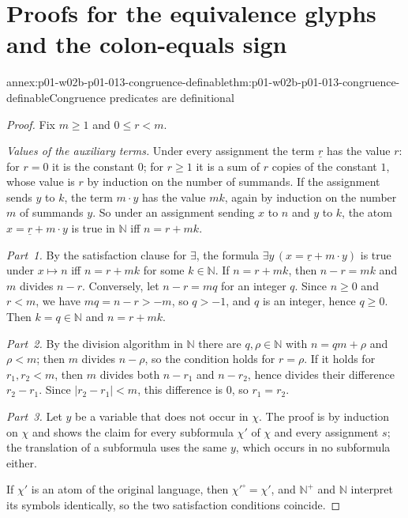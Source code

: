 \section{Proofs for the equivalence glyphs and the colon-equals sign}
\label{sec:annex-p01-w02b-p01-013-equivalence-audit}

\begin{annexitem}{annex:p01-w02b-p01-013-congruence-definable}{thm:p01-w02b-p01-013-congruence-definable}{Congruence predicates are definitional}
\begin{proof}
Fix \(m\geq1\) and \(0\leq r<m\).

\emph{Values of the auxiliary terms.}  Under every assignment the term
\(\underline r\) has the value \(r\): for \(r=0\) it is the constant \(0\);
for \(r\geq1\) it is a sum of \(r\) copies of the constant \(1\), whose value
is \(r\) by induction on the number of summands.  If the assignment sends
\(y\) to \(k\), the term \(m\cdot y\) has the value \(mk\), again by induction
on the number \(m\) of summands \(y\).  So under an assignment sending \(x\)
to \(n\) and \(y\) to \(k\), the atom \(x=\underline r+m\cdot y\) is true in
\(\mathbb N\) iff \(n=r+mk\).

\emph{Part~1.}  By the satisfaction clause for \(\exists\), the formula
\(\exists y\,(x=\underline r+m\cdot y)\) is true under \(x\mapsto n\) iff
\(n=r+mk\) for some \(k\in\mathbb N\).  If \(n=r+mk\), then \(n-r=mk\) and
\(m\) divides \(n-r\).  Conversely, let \(n-r=mq\) for an integer \(q\).
Since \(n\geq0\) and \(r<m\), we have \(mq=n-r>-m\), so \(q>-1\), and \(q\)
is an integer, hence \(q\geq0\).  Then \(k=q\in\mathbb N\) and \(n=r+mk\).

\emph{Part~2.}  By the division algorithm in \(\mathbb N\) there are
\(q,\rho\in\mathbb N\) with \(n=qm+\rho\) and \(\rho<m\); then \(m\) divides
\(n-\rho\), so the condition holds for \(r=\rho\).  If it holds for
\(r_1,r_2<m\), then \(m\) divides both \(n-r_1\) and \(n-r_2\), hence divides
their difference \(r_2-r_1\).  Since \(|r_2-r_1|<m\), this difference is
\(0\), so \(r_1=r_2\).

\emph{Part~3.}  Let \(y\) be a variable that does not occur in \(\chi\).  The
proof is by induction on \(\chi\) and shows the claim for every subformula
\(\chi'\) of \(\chi\) and every assignment \(s\); the translation of a
subformula uses the same \(y\), which occurs in no subformula either.

If \(\chi'\) is an atom of the original language, then
\(\chi'^{\circ}=\chi'\), and \(\mathbb N^{+}\) and \(\mathbb N\) interpret
its symbols identically, so the two satisfaction conditions coincide.


\end{proof}
\end{annexitem}
